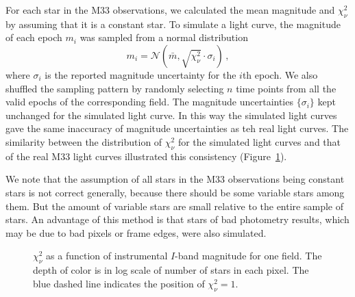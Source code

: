 For each star in the M33 observations, we calculated the mean magnitude and $\chi_\nu^2$ by assuming that it is a constant star. To simulate a light curve, the magnitude of each epoch $m_i$ was sampled from a normal distribution
\begin{equation}
m_i = \mathcal{N}(\bar m,\sqrt{\chi_\nu^2}\cdot\sigma_i)\,,
\end{equation}
where $\sigma_i$ is the reported magnitude uncertainty for the $i$th epoch. We also shuffled the sampling pattern by randomly selecting $n$ time points from all the valid epochs of the corresponding field. The magnitude uncertainties $\{\sigma_i\}$ kept unchanged for the simulated light curve. In this way the simulated light curves gave the same inaccuracy of magnitude uncertainties as teh real light curves. The similarity between the distribution of $\chi_\nu^2$ for the simulated light curves and that of the real M33 light curves illustrated this consistency (Figure~\ref{fig.chi.dist.example}). 





We note that the assumption of all stars in the M33 observations being constant stars is not correct generally, because there should be some variable stars among them. But the amount of variable stars are small relative to the entire sample of stars. An advantage of this method is that stars of bad photometry results, which may be due to bad pixels or frame edges, were also simulated.


\begin{figure}
\caption{$\chi_\nu^2$ as a function of instrumental $I$-band magnitude for one field. The depth of color is in log scale of number of stars in each pixel. The blue dashed line indicates the position of $\chi_\nu^2=1$.}\label{fig.chi.dist.example}
\end{figure}

